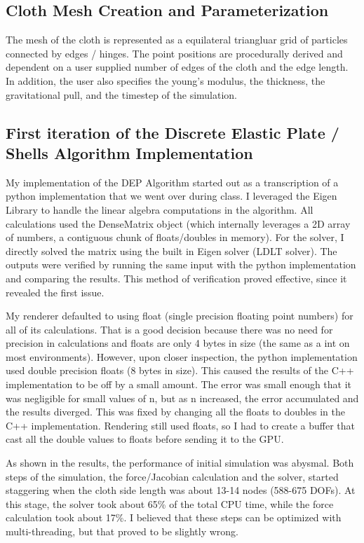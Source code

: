 \documentclass[letterpaper, 10 pt, conference]{ieeeconf}  %
\begin{document}
\subsection{Cloth Mesh Creation and Parameterization}
The mesh of the cloth is represented as a equilateral triangluar grid of particles connected by edges / hinges. The point positions are procedurally derived and dependent on a user supplied number of edges of the cloth and the edge length. In addition, the user also specifies the young's modulus, the thickness, the gravitational pull, and the timestep of the simulation.

\subsection{First iteration of the Discrete Elastic Plate / Shells Algorithm Implementation}

My implementation of the DEP Algorithm started out as a transcription of a python implementation that we went over during class. I leveraged the Eigen Library \cite{eigen_library} to handle the linear algebra computations in the algorithm. All calculations used the DenseMatrix object (which internally leverages a 2D array of numbers, a contiguous chunk of floats/doubles in memory). For the solver, I directly solved the matrix using the built in Eigen solver (LDLT solver). The outputs were verified by running the same input with the python implementation and comparing the results. This method of verification proved effective, since it revealed the first issue. 

My renderer defaulted to using float (single precision floating point numbers) for all of its calculations. That is a good decision because there was no need for precision in calculations and floats are only 4 bytes in size (the same as a int on most environments). However, upon closer inspection, the python implementation used double precision floats (8 bytes in size). This caused the results of the C++ implementation to be off by a small amount. The error was small enough that it was negligible for small values of n, but as n increased, the error accumulated and the results diverged. This was fixed by changing all the floats to doubles in the C++ implementation. Rendering still used floats, so I had to create a buffer that cast all the double values to floats before sending it to the GPU.

As shown in the results, the performance of initial simulation was abysmal. Both steps of the simulation, the force/Jacobian calculation and the solver, started staggering when the cloth side length was about 13-14 nodes (588-675 DOFs). At this stage, the solver took about 65\% of the total CPU time, while the force calculation took about 17\%. I believed that these steps can be optimized with multi-threading, but that proved to be slightly wrong. 
\end{document}

